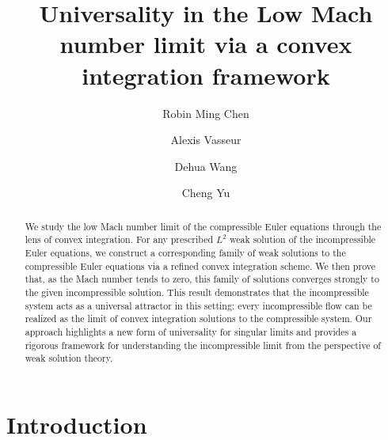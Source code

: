 \documentclass[12pt,reqno]{amsart}
\author{Robin Ming Chen}
\author{Alexis Vasseur}
\author{Dehua Wang}
\author{Cheng Yu}
\title[Incompressible Limit of Weak Solutions]
{Universality in the Low Mach number limit via a convex integration framework}
\theoremstyle{definition}
\theoremstyle{remark}
\numberwithin{equation}{section}
\begin{document}
\begin{abstract}

We study the low Mach number limit of the compressible Euler equations through the lens of convex integration. For any prescribed $L^2$ weak solution of the incompressible Euler equations, we construct a corresponding family of weak solutions to the compressible Euler equations via a refined convex integration scheme. We then prove that, as the Mach number tends to zero, this family of solutions converges strongly to the given incompressible solution. This result demonstrates that the incompressible system acts as a universal attractor in this setting: every incompressible flow can be realized as the limit of convex integration solutions to the compressible system. Our approach highlights a new form of universality for singular limits and provides a rigorous framework for understanding the incompressible limit from the perspective of weak solution theory.

\end{abstract}


\maketitle 

\section{Introduction}
\end{document}
